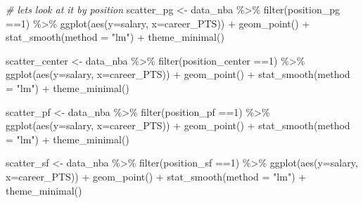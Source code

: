 \documentclass[
]{book}
\newenvironment{Shaded}{\begin{snugshade}}{\end{snugshade}}
\newcommand{\AttributeTok}[1]{\textcolor[rgb]{0.77,0.63,0.00}{#1}}
\newcommand{\AttributeTok}[1]{\textcolor[rgb]{0.13,0.29,0.53}{#1}}
\newcommand{\CommentTok}[1]{\textcolor[rgb]{0.56,0.35,0.01}{\textit{#1}}}
\newcommand{\DecValTok}[1]{\textcolor[rgb]{0.00,0.00,0.81}{#1}}
\newcommand{\FunctionTok}[1]{\textcolor[rgb]{0.00,0.00,0.00}{#1}}
\newcommand{\FunctionTok}[1]{\textcolor[rgb]{0.13,0.29,0.53}{\textbf{#1}}}
\newcommand{\NormalTok}[1]{#1}
\newcommand{\OtherTok}[1]{\textcolor[rgb]{0.56,0.35,0.01}{#1}}
\newcommand{\SpecialCharTok}[1]{\textcolor[rgb]{0.00,0.00,0.00}{#1}}
\newcommand{\SpecialCharTok}[1]{\textcolor[rgb]{0.81,0.36,0.00}{\textbf{#1}}}
\newcommand{\StringTok}[1]{\textcolor[rgb]{0.31,0.60,0.02}{#1}}
\begin{document}
\begin{Shaded}
\begin{Highlighting}[]
\CommentTok{\# let\textquotesingle{}s look at it by position}
\NormalTok{scatter\_pg }\OtherTok{\textless{}{-}}\NormalTok{ data\_nba }\SpecialCharTok{\%\textgreater{}\%} \FunctionTok{filter}\NormalTok{(position\_pg }\SpecialCharTok{==}\DecValTok{1}\NormalTok{) }\SpecialCharTok{\%\textgreater{}\%}
  \FunctionTok{ggplot}\NormalTok{(}\FunctionTok{aes}\NormalTok{(}\AttributeTok{y=}\NormalTok{salary, }\AttributeTok{x=}\NormalTok{career\_PTS)) }\SpecialCharTok{+}
    \FunctionTok{geom\_point}\NormalTok{() }\SpecialCharTok{+} 
     \FunctionTok{stat\_smooth}\NormalTok{(}\AttributeTok{method =} \StringTok{"lm"}\NormalTok{) }\SpecialCharTok{+} 
       \FunctionTok{theme\_minimal}\NormalTok{()}

\NormalTok{scatter\_center }\OtherTok{\textless{}{-}}\NormalTok{ data\_nba }\SpecialCharTok{\%\textgreater{}\%} \FunctionTok{filter}\NormalTok{(position\_center }\SpecialCharTok{==}\DecValTok{1}\NormalTok{) }\SpecialCharTok{\%\textgreater{}\%}
  \FunctionTok{ggplot}\NormalTok{(}\FunctionTok{aes}\NormalTok{(}\AttributeTok{y=}\NormalTok{salary, }\AttributeTok{x=}\NormalTok{career\_PTS)) }\SpecialCharTok{+}
    \FunctionTok{geom\_point}\NormalTok{() }\SpecialCharTok{+} 
     \FunctionTok{stat\_smooth}\NormalTok{(}\AttributeTok{method =} \StringTok{"lm"}\NormalTok{) }\SpecialCharTok{+} 
       \FunctionTok{theme\_minimal}\NormalTok{()}

\NormalTok{scatter\_pf }\OtherTok{\textless{}{-}}\NormalTok{ data\_nba }\SpecialCharTok{\%\textgreater{}\%} \FunctionTok{filter}\NormalTok{(position\_pf }\SpecialCharTok{==}\DecValTok{1}\NormalTok{) }\SpecialCharTok{\%\textgreater{}\%}
  \FunctionTok{ggplot}\NormalTok{(}\FunctionTok{aes}\NormalTok{(}\AttributeTok{y=}\NormalTok{salary, }\AttributeTok{x=}\NormalTok{career\_PTS)) }\SpecialCharTok{+}
    \FunctionTok{geom\_point}\NormalTok{() }\SpecialCharTok{+} 
     \FunctionTok{stat\_smooth}\NormalTok{(}\AttributeTok{method =} \StringTok{"lm"}\NormalTok{) }\SpecialCharTok{+} 
       \FunctionTok{theme\_minimal}\NormalTok{()}

\NormalTok{scatter\_sf }\OtherTok{\textless{}{-}}\NormalTok{ data\_nba }\SpecialCharTok{\%\textgreater{}\%} \FunctionTok{filter}\NormalTok{(position\_sf }\SpecialCharTok{==}\DecValTok{1}\NormalTok{) }\SpecialCharTok{\%\textgreater{}\%}
  \FunctionTok{ggplot}\NormalTok{(}\FunctionTok{aes}\NormalTok{(}\AttributeTok{y=}\NormalTok{salary, }\AttributeTok{x=}\NormalTok{career\_PTS)) }\SpecialCharTok{+}
    \FunctionTok{geom\_point}\NormalTok{() }\SpecialCharTok{+} 
     \FunctionTok{stat\_smooth}\NormalTok{(}\AttributeTok{method =} \StringTok{"lm"}\NormalTok{) }\SpecialCharTok{+} 
       \FunctionTok{theme\_minimal}\NormalTok{()}


\end{Highlighting}
\end{Shaded}
\end{document}
